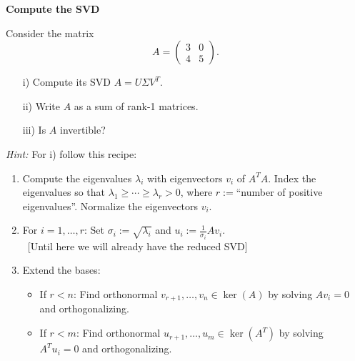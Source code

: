 \textbf{\normalsize Compute the SVD}

	Consider the matrix
	$$A = \begin{pmatrix}
	3 &0\\4&5
	\end{pmatrix}.$$
	\begin{itemize}
		\item[i)] Compute its SVD $A = U\Sigma V^T$.
		\item[ii)] Write $A$ as a sum of rank-1 matrices.
		\item[iii)] Is $A$ invertible?
	\end{itemize}

\textit{Hint:} For i) follow this recipe:
\begin{enumerate}
	\color{navy}
	\item Compute the eigenvalues $\lambda_i$ with eigenvectors $v_i$ of $A^TA$. Index the eigenvalues so that $\lambda_1 \geq \cdots \geq \lambda_r > 0$, where $r := $``number of positive eigenvalues''. Normalize the eigenvectors $v_i$. 
	\vspace{-0.2cm}\item For $i =1,\ldots, r$: Set $\sigma_i := \sqrt{\lambda_i}$ and $u_i := \frac{1}{\sigma_i} Av_i$.\\ ~[Until here we will already have the reduced SVD]
		\vspace{-0.2cm}\item Extend the bases: 
		\vspace{-0.2cm}\begin{itemize}
\item If $r < n$: Find orthonormal $v_{r+1}, \ldots, v_n \in \ker(A)$ by solving $A v_i = 0$ and orthogonalizing.
	\vspace{-0.2cm}\item If $r < m$: Find orthonormal $u_{r+1}, \ldots, u_m \in \ker(A^T)$ by solving $A^Tu_i = 0$ and orthogonalizing.
				  
\end{itemize}
\end{enumerate}
